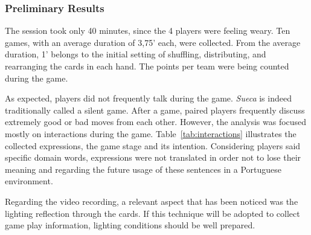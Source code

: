 \subsubsection{Preliminary Results}
The session took only 40 minutes, since the 4 players were feeling weary.
Ten games, with an average duration of 3,75' each, were collected.
From the average duration, 1' belongs to the initial setting of shuffling, distributing, and rearranging the cards in each hand.
The points per team were being counted during the game.

As expected, players did not frequently talk during the game.
\emph{Sueca} is indeed traditionally called a silent game.
After a game, paired players frequently discuss extremely good or bad moves from each other.
However, the analysis was focused mostly on interactions during the game.
Table~\ref{tab:interactions} illustrates the collected expressions, the game stage and its intention.
Considering players said specific domain words, expressions were not translated in order not to lose their meaning and regarding the future usage of these sentences in a Portuguese environment.


\begin{table}[h]
\caption{Examples of expressions collected during the card game activity and its respective classification.}
\label{tab:interactions}
\end{table}


Regarding the video recording, a relevant aspect that has been noticed was the lighting reflection through the cards.
If this technique will be adopted to collect game play information, lighting conditions should be well prepared.









